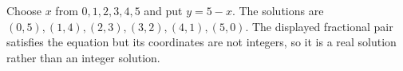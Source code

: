 Choose $x$ from $0,1,2,3,4,5$ and put $y=5-x$. The solutions are $\boxed{(0,5),(1,4),(2,3),(3,2),(4,1),(5,0)}$. The displayed fractional pair satisfies the equation but its coordinates are not integers, so it is a real solution rather than an integer solution.

